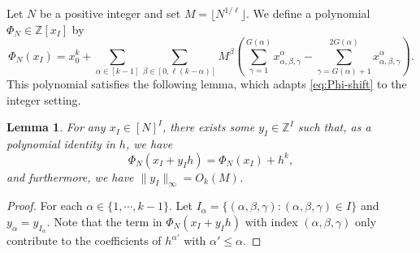 \documentclass[12pt,reqno]{amsart}
\theoremstyle{plain}
\newtheorem{lemma}[theorem]{Lemma}
\theoremstyle{definition}
\newcommand{\Z}{\mathbb{Z}}
\newcommand{\1}{\mathbf{1}}
\newcommand{\infnorm}[1]{\lVert #1 \rVert_\infty}
\begin{document}
Let $N$ be a positive integer and set $M = \lfloor N^{1 / \ell} \rfloor$.  We define a polynomial $\Phi_N \in \Z[x_{I}]$ by
$$\Phi_N(x_I) = x_0^k + \sum_{\alpha \in [k - 1]}\sum_{\beta \in [0, \ell (k - \alpha)]} M^{\beta} \left(\sum_{\gamma = 1}^{G(\alpha)} x_{\alpha, \beta, \gamma}^{\alpha} -  \sum_{\gamma = G(\alpha) + 1}^{2G(\alpha)} x_{\alpha, \beta, \gamma}^{\alpha}\right).$$
This polynomial satisfies the following lemma, which adapts \eqref{eq:Phi-shift} to the integer setting.
\begin{lemma}
    \label{lem:nice--line}
    For any $x_I \in [N]^I$, there exists some $y_I \in \Z^I$ such that, as a polynomial identity in $h$, we have
    $$\Phi_N(x_I + y_I h) = \Phi_N(x_I) + h^k,$$
    and furthermore, we have $\infnorm{y_I} = O_k(M)$.
\end{lemma}
\begin{proof}
    For each $\alpha \in \{1, \cdots, k - 1\}$. Let $I_{\alpha} = \{(\alpha, \beta, \gamma): (\alpha, \beta, \gamma) \in I\}$ and $y_{\alpha} = y_{I_{\alpha}}$. Note that the term in $\Phi_N(x_I + y_I h)$ with index $(\alpha, \beta, \gamma)$ only contribute to the coefficients of $h^{\alpha'}$ with $\alpha' \leq \alpha$. 
    

\end{proof}
\end{document}
